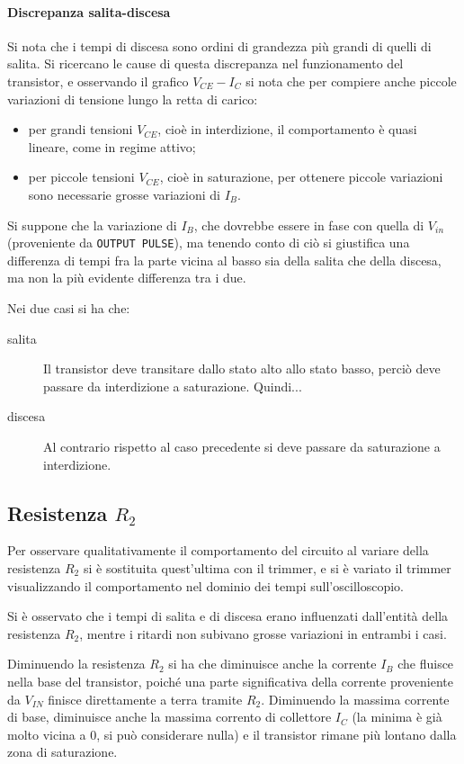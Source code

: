 \documentclass[10pt,a4paper]{article}
\def\code#1{\texttt{#1}}
\begin{document}
\paragraph{Discrepanza salita-discesa} Si nota che i tempi di discesa sono ordini di grandezza più grandi di quelli di salita. Si ricercano le cause di questa discrepanza nel funzionamento del transistor, e osservando il grafico $V_{CE} - I_C$ si nota che per compiere anche piccole variazioni di tensione lungo la retta di carico:
\begin{itemize}
\item per grandi tensioni $V_{CE}$, cioè in interdizione, il comportamento è quasi lineare, come in regime attivo;
\item per piccole tensioni $V_{CE}$, cioè in saturazione, per ottenere piccole variazioni sono necessarie grosse variazioni di $I_B$.
\end{itemize}
Si suppone che la variazione di $I_B$, che dovrebbe essere in fase con quella di $V_{in}$ (proveniente da \code{OUTPUT PULSE}), ma tenendo conto di ciò si giustifica una differenza di tempi fra la parte vicina al basso sia della salita che della discesa, ma non la più evidente differenza tra i due.


Nei due casi si ha che:
\begin{description}
\item[salita] Il transistor deve transitare dallo stato alto allo stato basso, perciò deve passare da interdizione a saturazione. Quindi...
\item[discesa] Al contrario rispetto al caso precedente si deve passare da saturazione a interdizione.
\end{description}

\subsection{Resistenza $R_2$}
Per osservare qualitativamente il comportamento del circuito al variare della resistenza $R_2$ si è sostituita quest'ultima con il trimmer, e si è variato il trimmer visualizzando il comportamento nel dominio dei tempi sull'oscilloscopio.

Si è osservato che i tempi di salita e di discesa erano influenzati dall'entità della resistenza $R_2$, mentre i ritardi non subivano grosse variazioni in entrambi i casi.

Diminuendo la resistenza $R_2$ si ha che diminuisce anche la corrente $I_B$ che fluisce nella base del transistor, poiché una parte significativa della corrente proveniente da $V_{IN}$ finisce direttamente a terra tramite $R_2$. Diminuendo la massima corrente di base, diminuisce anche la massima corrento di collettore $I_C$ (la minima è già molto vicina a 0, si può considerare nulla) e il transistor rimane più lontano dalla zona di saturazione.
\end{document}
